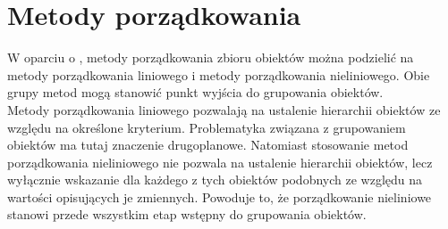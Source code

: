 \documentclass[12pt,a4paper]{report}
\begin{document}
\chapter{Metody porządkowania}

W oparciu o \cite[Rozdział 2]{panek2013}, metody porządkowania zbioru obiektów można podzielić na metody porządkowania liniowego i metody porządkowania nieliniowego. Obie grupy metod mogą stanowić punkt wyjścia do grupowania obiektów. \\
Metody porządkowania liniowego pozwalają na ustalenie hierarchii obiektów ze względu na określone kryterium. Problematyka związana z grupowaniem obiektów ma tutaj znaczenie drugoplanowe. Natomiast stosowanie metod porządkowania nieliniowego nie pozwala na ustalenie hierarchii obiektów, lecz wyłącznie wskazanie dla każdego z tych obiektów podobnych ze względu na wartości opisujących je zmiennych. Powoduje to, że porządkowanie nieliniowe stanowi przede wszystkim etap wstępny do grupowania obiektów.
\end{document}
